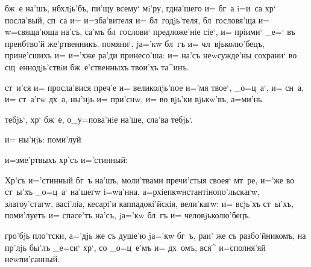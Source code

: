  бж~е на'шъ, нб хлjь'бъ, пи'щу всему` мi'ру, 
гд на'шего и= бг~а i=и~са хр` посла'вый, сп~са и= 
и=зба'вителя и= бл~годjь'теля, бл~гословя'ща и= 
w=свяща'юща на'съ, са'мъ бл~гослови` предложе'нiе сiе`, 
и= прiими` _е=` въ пренб тво'й же'ртвенникъ. 
помяни`, jа='кw бл~гъ и= чл~вjьколю'бецъ, прине'сшихъ и= 
и='хже ра'ди принесо'ша: и= на'съ неwсужде'ны сохрани` во 
сщ~еннодjь'ствiи бж~е'ственныхъ твои'хъ та^инъ.

 ст~и'ся и= просла'вися преч'е и= 
великолjь'пое и='мя твое`, _о=ц~а`, и= сн~а, и= ст~а'гw 
дх~а, ны'нjь и= при'снw, и= во вjь'ки вjькw'въ, а=ми'нь.


 тебjь`, хр` бж~е, о_у=пова'нiе на'ше, 
сла'ва тебjь`.

  и= ны'нjь:  поми'луй 



 и=з\ъ ме'ртвыхъ хр'съ и='стинный:


Хр'съ и='стинный бг~ъ на'шъ, моли'твами пречи'стыя 
своея` мт~ре, и='же во ст~ы'хъ _о=ц~а` на'шегw i=wа'нна, 
а=рхiеп кwнстантiнопо'льскагw, златоу'стагw, \kinovarsimple{[а='ще 
же соверша'ется лiтургi'а вели'кагw васi'лiа, глаго'летъ:} 
васi'лiа, кесарi'и каппадокi'йскiя, вели'кагw:\kinovarsimple{]} и= 
всjь'хъ ст~ы'хъ, поми'луетъ и= спасе'тъ на'съ, jа='кw 
бл~гъ и= человjьколю'бецъ.

 


 гро'бjь пло'тски,  а='дjь же съ душе'ю jа='кw 
бг~ъ,  раи' же съ разбо'йникомъ,  на пр'лjь бы'лъ 
_е=си` хр`, со _о=ц~е'мъ и= дх~омъ, вся^ и=сполня'яй 
неwпи'санный.


